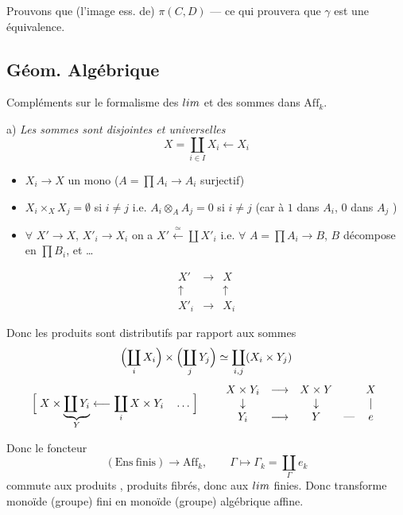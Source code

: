 \documentclass[11pt,a4paper]{article}
\begin{document}
Prouvons que  \struck{\ill{}} (l'image ess. de) $\pi(C, D)$ --- ce qui prouvera que $\gamma$ est une équivalence.


\subsection*{Géom. Algébrique}

Compléments sur le formalisme des $\varprojlim$ et des sommes dans $\mathrm{Aff}_k$.

a) \emph{Les sommes  sont disjointes et universelles}
\[
X = \coprod_{i \in I} X_i \longleftarrow X_i
\]

\begin{itemize}
  \item[1)] $X_i \to X$ un mono  \quad ($A = \prod A_i \to A_i$ surjectif)
  \item[2)] $X_i \times_X X_j = \emptyset$ si $i \neq j$ \quad i.e. $A_i \otimes_A A_j = 0$ si $i \neq j$ (car  à $1$ dans $A_i$, $0$ dans $A_j$ \struck{\ill{}})
  \item[3)] $\forall$ $X' \to X$,  $X'_i \to X_i$ \quad on a $X' \xleftarrow{\ \simeq\ } \coprod X'_i$ \quad i.e. $\forall$ $A = \prod A_i \to B$, $B$ décompose en $\prod B_i$, et …
\end{itemize}

\[
\begin{array}{ccc}
X' & \longrightarrow & X \\
\uparrow & & \uparrow \\
X'_i & \longrightarrow & X_i
\end{array}
\]

 Donc les produits  sont distributifs par rapport aux sommes
\[
\Bigl(\coprod_i X_i\Bigr) \times \Bigl(\coprod_j Y_j\Bigr) \simeq \coprod_{i,j} (X_i \times Y_j)
\]
\[
\Bigl[\; X \times \underbrace{\coprod Y_i}_{Y} \longleftarrow \coprod_i X \times Y_i \quad \ldots \;\Bigr]
\qquad
\begin{array}{ccccc}
X \times Y_i & \longrightarrow & X \times Y & & X \\
\downarrow & & \downarrow & & | \\
Y_i & \longrightarrow & Y & \text{---} & e
\end{array}
\]

Donc le foncteur
\[
(\mathrm{Ens\ finis}) \longrightarrow \mathrm{Aff}_k, \qquad \Gamma \longmapsto \Gamma_k = \coprod_{\Gamma} e_k
\]
commute aux  produits ,   produits fibrés, donc aux $\varprojlim$ finies. Donc transforme monoïde (groupe) fini en monoïde (groupe) algébrique affine.
\end{document}
